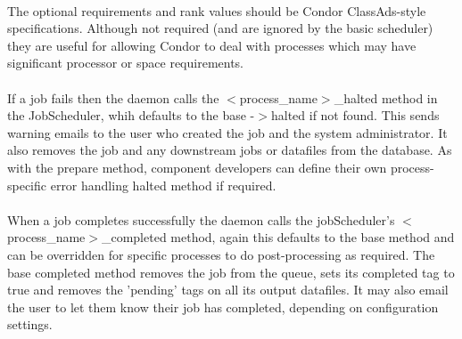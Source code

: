\paragraph{}
The optional requirements and rank values should be Condor ClassAds-style \citep{raman:98} specifications. Although not required (and are ignored by the basic scheduler) they are useful for allowing Condor to deal with processes which may have significant processor or space requirements. 

\paragraph{}
If a job fails then the daemon calls the $<$process\_name$>$\_halted method in the JobScheduler, whih defaults to the base -$>$halted if not found. This sends warning emails to the user who created the job and the system administrator. It also removes the job and any downstream jobs or datafiles from the database. As with the prepare method, component developers can define their own process-specific error handling halted method if required.

\paragraph{}
When a job completes successfully the daemon calls the jobScheduler's $<$process\_name$>$\_completed method, again this defaults to the base method and can be overridden for specific processes to do post-processing as required. The base completed method removes the job from the queue, sets its completed tag to true and removes the 'pending' tags on all its output datafiles. It may also email the user to let them know their job has completed, depending on configuration settings.
